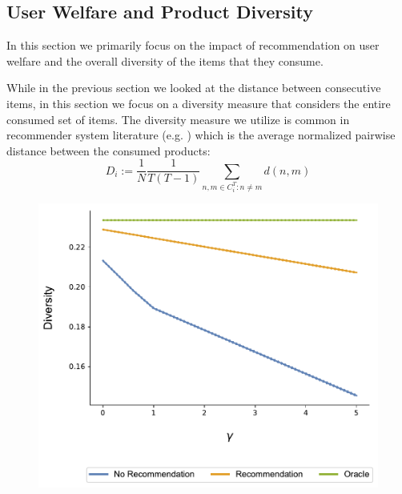 \documentclass[format=acmsmall, review=false]{acmart}
\begin{document}
\subsection{User Welfare and Product Diversity}
In this section we primarily focus on the impact of recommendation on user welfare and the overall diversity of the items that they consume.
\par 
While in the previous section we looked at the distance between consecutive items, in this section we focus on a diversity measure that considers the entire consumed set of items. The diversity measure we utilize is common in recommender system literature (e.g. \cite{ziegler2005improving}) which is the average normalized pairwise distance between the consumed products:
$$D_i:=\frac{1}{N}\frac{1}{T(T-1)}\sum_{n,m \in C_i^T: n \ne m} d(n,m)$$

\begin{figure}[ht]
\includegraphics[width=.45\linewidth]{figures/gamma_diversity_N_200_T_20}
\label{fig:risk_aversion_diversity}
\end{figure}
\end{document}
